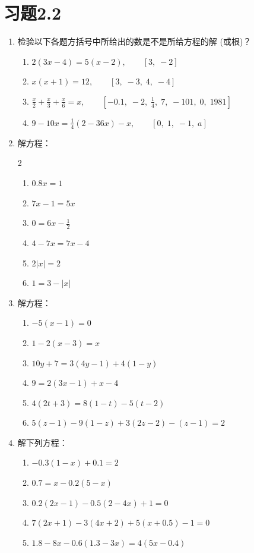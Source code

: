 \section*{习题2.2}

\begin{enumerate}
\item 检验以下各题方括号中所给出的数是不是所给方程的解
(或根)？
\begin{enumerate}
    \item $2 (3x-4)=5(x-2),\qquad [3,\; -2]$
    \item $ x(x+ 1)=12,\qquad [3,\; -3,\; 4,\; -4]$
    \item $\frac{x}{2}+\frac{x}{3}+\frac{x}{6}=x,\qquad \left[-0.1,\; -2,\; \frac{1}{4},\; 7,\; -101,\; 0,\; 1981\right]$
    \item $9-10x=\frac{1}{4}(2-36x)-x,\qquad [0,\; 1,\; -1,\; a]$
\end{enumerate}

\item 解方程：
\begin{multicols}{2}
\begin{enumerate}
    \item $0.8x=1$
    \item $7x-1=5x$
    \item $0=6x-\frac{1}{2}$
    \item $4-7x=7x-4$
    \item $2|x|=2$
    \item $1=3-|x|$
\end{enumerate}
\end{multicols}

\item 解方程：
\begin{enumerate}
    \item $-5(x-1)=0$
    \item $1-2(x-3)=x$
    \item $10y+7=3(4y-1)+4(1-y)$
    \item $9=2(3x-1)+x-4$
    \item $4(2t+3)=8(1-t)-5(t-2)$
    \item $5(z-1)-9(1-z)+3(2z-2)-(z-1)=2$
\end{enumerate}

\item 解下列方程：
\begin{enumerate}
    \item $-0.3(1-x)+0.1=2$
    \item $0.7=x-0.2(5-x)$
    \item $0.2(2x-1)-0.5(2-4x)+1=0$
    \item $7(2x+1)-3(4x+2)+5(x+0.5)-1=0$
    \item $1.8-8x-0.6(1.3-3x)=4(5x-0.4)$
\end{enumerate}


\end{enumerate}
